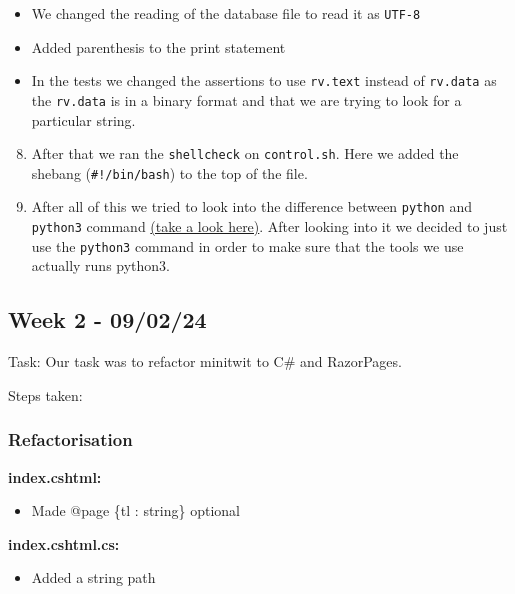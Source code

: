 \begin{itemize}
    \item We changed the reading of the database file to read it as \texttt{UTF-8}
    \item Added parenthesis to the print statement
    \item In the tests we changed the assertions to use \texttt{rv.text} instead of \texttt{rv.data} as the \texttt{rv.data} is in a binary format and that we are trying to look for a particular string.
\end{itemize}

\begin{enumerate}
\setcounter{enumi}{7}
    \item After that we ran the \texttt{shellcheck} on \texttt{control.sh}. Here we added the shebang (\texttt{\#!/bin/bash}) to the top of the file.
    \item After all of this we tried to look into the difference between \texttt{python} and \texttt{python3} command \href{https://stackoverflow.com/questions/64801225/python-or-python3-what-is-the-difference}{(take a look here)}. After looking into it we decided to just use the \texttt{python3} command in order to make sure that the tools we use actually runs python3.
\end{enumerate}

\subsection{Week 2 - 09/02/24}
\label{log:week2}

Task: Our task was to refactor minitwit to C\# and RazorPages.

Steps taken:

\subsubsection{Refactorisation}
\label{log:refactorization}

\textbf{index.cshtml:}

\begin{itemize}
    \item Made @page \{tl : string\} optional
\end{itemize}

\textbf{index.cshtml.cs:}

\begin{itemize}
    \item Added a string path
\end{itemize}

